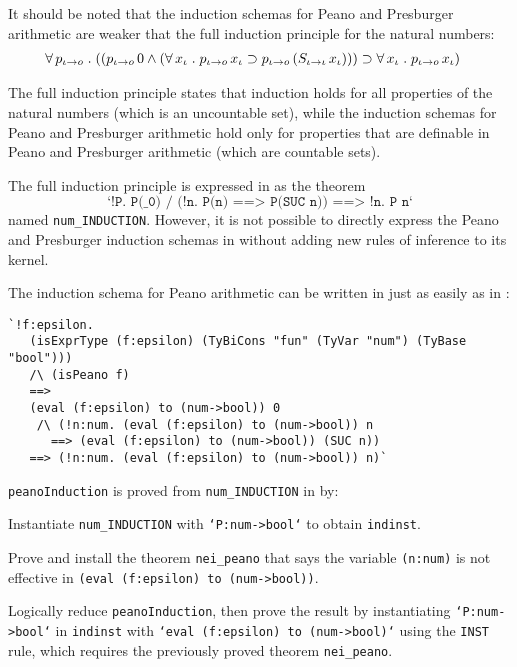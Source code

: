 \documentclass[fleqn]{llncs}
\begin{document}
It should be noted that the induction schemas for Peano and Presburger
arithmetic are weaker that the full induction principle for the
natural numbers:
\begin{align*}
&
\forall\, p_{\iota \rightarrow o} \mathrel. 
((p_{\iota \rightarrow o} \, 0 \wedge
(\forall\, x_\iota \mathrel. p_{\iota \rightarrow o} \, x_\iota \supset
p_{\iota \rightarrow o} \, (S_{\iota \rightarrow \iota} \, x_\iota)))
\supset 
\forall\, x_\iota \mathrel. p_{\iota \rightarrow o} \, x_\iota)
\end{align*}

\noindent
The full induction principle states that induction holds for all
properties of the natural numbers (which is an uncountable set), while
the induction schemas for Peano and Presburger arithmetic hold only
for properties that are definable in Peano and Presburger arithmetic
(which are countable sets).

The full induction principle is expressed in {\HL} as the
theorem \[\texttt{`!P. P(\_0) /\ (!n. P(n) ==> P(SUC n)) ==> !n. P
  n`}\] named \texttt{num\_INDUCTION}.  However, it is not possible to
directly express the Peano and Presburger induction schemas in {\HL}
without adding new rules of inference to its kernel.

\bsp
The induction schema for Peano arithmetic can be written in
{\HLQE} just as easily as in {\churchqe}:
\begin{lstlisting}
`!f:epsilon. 
   (isExprType (f:epsilon) (TyBiCons "fun" (TyVar "num") (TyBase "bool"))) 
   /\ (isPeano f) 
   ==> 
   (eval (f:epsilon) to (num->bool)) 0 
    /\ (!n:num. (eval (f:epsilon) to (num->bool)) n 
      ==> (eval (f:epsilon) to (num->bool)) (SUC n)) 
   ==> (!n:num. (eval (f:epsilon) to (num->bool)) n)`
\end{lstlisting}
\esp

\noindent \texttt{peanoInduction} is proved from
\texttt{num\_INDUCTION} in {\HLQE} by:

\bsp
\be

  \item Instantiate \texttt{num\_INDUCTION} with
    \texttt{`P:num->bool`} to obtain \texttt{indinst}.

  \item Prove and install the theorem \texttt{nei\_peano} that says the
    variable \texttt{(n:num)} is not effective in \texttt{(eval
      (f:epsilon) to (num->bool))}.

  \item Logically reduce \texttt{peanoInduction}, then prove the
    result by instantiating \texttt{`P:num->bool`} in \texttt{indinst}
    with \texttt{`eval (f:epsilon) to (num->bool)`} using the
    \texttt{INST} rule,  which requires the
    previously proved theorem \texttt{nei\_peano}.
\end{document}
